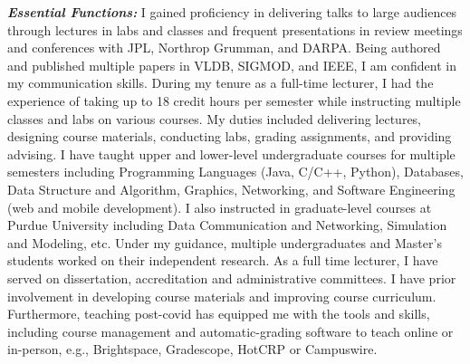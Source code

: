 \documentclass[9pt]{article}
\renewcommand*\paragraph[1]{}
\begin{document}
\paragraph{4) Good communication skills.}
\textbf{\textit{Essential Functions:}}
I gained proficiency in delivering talks to large audiences through lectures in labs and classes and frequent presentations in review meetings and conferences with JPL, Northrop Grumman, and DARPA. Being authored and published multiple papers in VLDB, SIGMOD, and IEEE, I am confident in my communication skills. During my tenure as a full-time lecturer, I had the experience of taking up to 18 credit hours per semester while instructing multiple classes and 
labs on various courses. My duties included delivering lectures, designing course materials, conducting labs, grading assignments, and providing advising. I have taught upper and lower-level undergraduate courses for multiple semesters including Programming Languages (Java, C/C++, Python), Databases, Data Structure and Algorithm, Graphics, Networking, and Software Engineering (web and mobile development). I also instructed in graduate-level courses at Purdue University including Data Communication and Networking, Simulation and Modeling, etc. 
Under my guidance, multiple undergraduates and Master's students worked on their independent research.
As a full time lecturer, I have served on dissertation, accreditation and administrative committees.
%
I have prior involvement in developing course materials and improving course curriculum.
%
Furthermore, teaching post-covid has equipped me with the tools and skills, including course management and automatic-grading
software to teach online or in-person, e.g., Brightspace, Gradescope, HotCRP or Campuswire.
\end{document}
